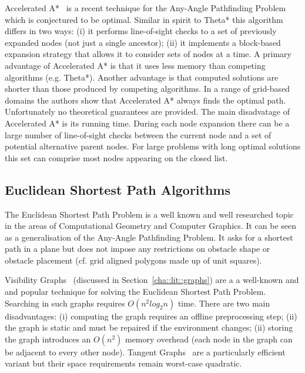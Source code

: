 Accelerated A*~\citep{sislak09a,sislak09b} is a recent technique for the Any-Angle Pathfinding
Problem which is conjectured to be optimal. Similar in spirit to Theta* this algorithm differs in
two ways: (i) it performs line-of-sight checks to a set of previously expanded nodes (not just a
single ancestor); (ii) it implements a block-based expansion strategy that allows it to consider
sets of nodes at a time.  
A primary advantage of Accelerated A* is that it uses less memory than competing algorithms (e.g.
Theta*).  Another advantage is that computed solutions are shorter than those produced by competing
algorithms. In a range of grid-based domains the authors show that Accelerated A* always finds the
optimal path.  Unfortunately no theoretical guarantees are provided.  The main disadvatage of
Accelerated A* is its running time. During each node expansion there can be a large number of
line-of-sight checks between the current node and a set of potential alternative parent nodes.  For
large problems with long optimal solutions this set can comprise most nodes appearing on the closed
list.


\subsection{Euclidean Shortest Path Algorithms}
\label{cha::lit::euclidean::euclidean}
The Euclidean Shortest Path Problem is a well known and well researched topic in the areas of
Computational Geometry and Computer Graphics. It can be seen as a generalisation of the Any-Angle 
Pathfinding Problem. It asks for a shortest path in a plane but does not impose any restrictions on
obstacle shape or obstacle placement (cf. grid aligned polygons made up of unit squares). 

Visibility Graphs~\cite{lozanoperez79} (discussed in Section~\ref{cha::lit::graphs})
are a a well-known and and popular technique for solving the Euclidean Shortest Path 
Problem. Searching in such graphs requires $O(n^2log_{2}{n})$ time.  There are two 
main disadvantages: (i) computing the graph requires an offline preprocessing step;
(ii) the graph is static and must be repaired if the environment changes;
(ii) storing the graph introduces an $O(n^2)$ memory overhead (each node in 
the graph can be adjacent to every other node). Tangent Graphs~\cite{liu92} are a 
particularly efficient variant but their space requirements remain worst-case 
quadratic. 

